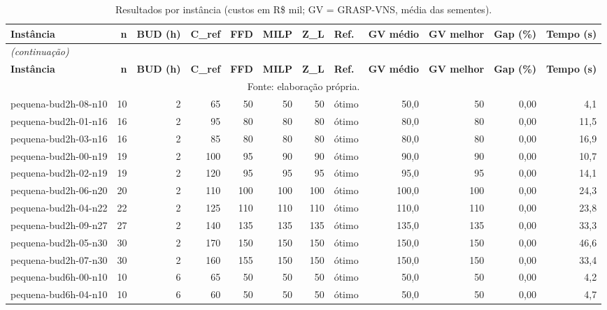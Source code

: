 \begingroup\scriptsize\setlength{\tabcolsep}{3pt}
\begin{longtable}{@{}lrrrrrrlrrrr@{}}
\caption{Resultados por instância (custos em R\$ mil; GV = GRASP-VNS, média das sementes).}\label{tab:por_instancia}\\
\toprule
\textbf{Instância} & \textbf{n} & \textbf{BUD (h)} & \textbf{C\_ref} & \textbf{FFD} & \textbf{MILP} & \textbf{Z\_L} & \textbf{Ref.} & \textbf{GV médio} & \textbf{GV melhor} & \textbf{Gap (\%)} & \textbf{Tempo (s)} \\
\midrule\endfirsthead
\multicolumn{12}{l}{\textit{(continuação)}}\\
\toprule
\textbf{Instância} & \textbf{n} & \textbf{BUD (h)} & \textbf{C\_ref} & \textbf{FFD} & \textbf{MILP} & \textbf{Z\_L} & \textbf{Ref.} & \textbf{GV médio} & \textbf{GV melhor} & \textbf{Gap (\%)} & \textbf{Tempo (s)} \\
\midrule\endhead
\bottomrule
\multicolumn{12}{c}{Fonte: elaboração própria.}\\
\endlastfoot
pequena-bud2h-08-n10 & 10 & 2 & 65 & 50 & 50 & 50 & ótimo & 50,0 & 50 & 0,00 & 4,1 \\
pequena-bud2h-01-n16 & 16 & 2 & 95 & 80 & 80 & 80 & ótimo & 80,0 & 80 & 0,00 & 11,5 \\
pequena-bud2h-03-n16 & 16 & 2 & 85 & 80 & 80 & 80 & ótimo & 80,0 & 80 & 0,00 & 16,9 \\
pequena-bud2h-00-n19 & 19 & 2 & 100 & 95 & 90 & 90 & ótimo & 90,0 & 90 & 0,00 & 10,7 \\
pequena-bud2h-02-n19 & 19 & 2 & 120 & 95 & 95 & 95 & ótimo & 95,0 & 95 & 0,00 & 14,1 \\
pequena-bud2h-06-n20 & 20 & 2 & 110 & 100 & 100 & 100 & ótimo & 100,0 & 100 & 0,00 & 24,3 \\
pequena-bud2h-04-n22 & 22 & 2 & 125 & 110 & 110 & 110 & ótimo & 110,0 & 110 & 0,00 & 23,8 \\
pequena-bud2h-09-n27 & 27 & 2 & 140 & 135 & 135 & 135 & ótimo & 135,0 & 135 & 0,00 & 33,3 \\
pequena-bud2h-05-n30 & 30 & 2 & 170 & 150 & 150 & 150 & ótimo & 150,0 & 150 & 0,00 & 46,6 \\
pequena-bud2h-07-n30 & 30 & 2 & 160 & 155 & 150 & 150 & ótimo & 150,0 & 150 & 0,00 & 33,4 \\
pequena-bud6h-00-n10 & 10 & 6 & 65 & 50 & 50 & 50 & ótimo & 50,0 & 50 & 0,00 & 4,2 \\
pequena-bud6h-04-n10 & 10 & 6 & 60 & 50 & 50 & 50 & ótimo & 50,0 & 50 & 0,00 & 4,7 \\

\end{longtable}
